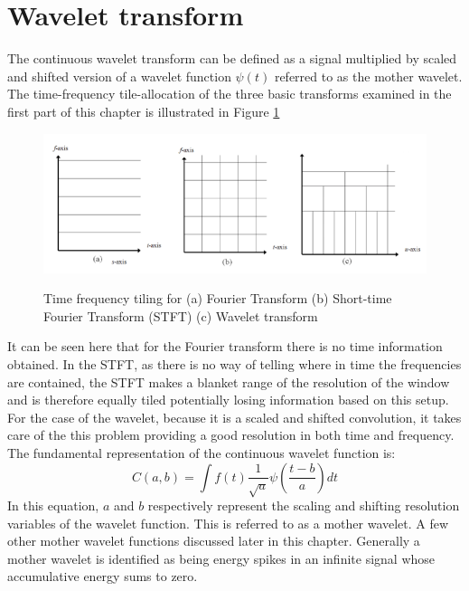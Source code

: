 \section{Wavelet transform}
The continuous wavelet transform can be defined as a signal multiplied by scaled and shifted version of a wavelet function $\psi(t)$ referred to as the mother wavelet. The time-frequency tile-allocation of the three basic transforms examined in the first part of this chapter is illustrated in Figure \ref{fig_4_2_tftile}

\begin{figure}
\centering
  \includegraphics[width=14cm]{thesis/images/tftile}\\
  \caption{Time frequency tiling for (a) Fourier Transform (b) Short-time Fourier Transform (STFT) (c) Wavelet transform}\label{fig_4_2_tftile}
\end{figure}

It can be seen here that for the Fourier transform there is no time information obtained.  In the STFT, as there is no way of telling where in time the frequencies are contained, the STFT makes a blanket range of the resolution of the window and is therefore equally tiled potentially losing information based on this setup.  For the case of the wavelet, because it is a scaled and shifted convolution, it takes care of the this problem providing a good resolution in both time and frequency.  The fundamental representation of the continuous wavelet function is:
\begin{equation}
C(a,b)=\int f(t)\frac{1}{\sqrt{a}}\psi\left(\frac{t-b}{a}\right)dt\label{eqn_c4_wavelet01}
\end{equation}
In this equation, $a$ and $b$ respectively represent the scaling and shifting resolution variables of the wavelet function. This is referred to as a mother wavelet. A few other mother wavelet functions discussed later in this chapter. Generally a mother wavelet is identified as being energy spikes in an infinite signal whose accumulative energy sums to zero.

